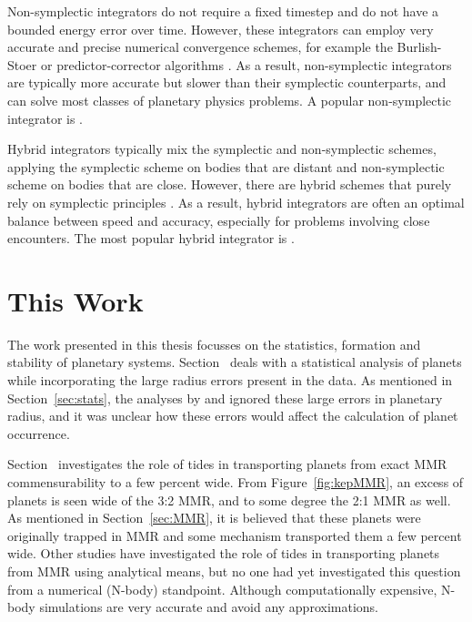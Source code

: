 Non-symplectic integrators do not require a fixed timestep and do not have a bounded energy error over time. 
However, these integrators can employ very accurate and precise numerical convergence schemes, for example the Burlish-Stoer or predictor-corrector algorithms \citep{Press2002}.
As a result, non-symplectic integrators are typically more accurate but slower than their symplectic counterparts, and can solve most classes of planetary physics problems. 
A popular non-symplectic integrator is \ias \citep{Rein2015}.

Hybrid integrators typically mix the symplectic and non-symplectic schemes, applying the symplectic scheme on bodies that are distant and non-symplectic scheme on bodies that are close. 
However, there are hybrid schemes that purely rely on symplectic principles \citep{Duncan1998}.
As a result, hybrid integrators are often an optimal balance between speed and accuracy, especially for problems involving close encounters. 
The most popular hybrid integrator is \mercury \citep{Chambers1999}.

\section{This Work}
The work presented in this thesis focusses on the statistics, formation and stability of planetary systems. 
Section~\label{Fill} deals with a statistical analysis of \kep planets while incorporating the large radius errors present in the \kep data. 
As mentioned in Section~\ref{sec:stats}, the analyses by \citet{Fressin2013} and \citet{Petigura2013} ignored these large errors in planetary radius, and it was unclear how these errors would affect the calculation of planet occurrence.

Section~\label{Fill} investigates the role of tides in transporting planets from exact MMR commensurability to a few percent wide. 
From Figure~\ref{fig:kepMMR}, an excess of planets is seen wide of the 3:2 MMR, and to some degree the 2:1 MMR as well. 
As mentioned in Section~\ref{sec:MMR}, it is believed that these planets were originally trapped in MMR and some mechanism transported them a few percent wide. 
Other studies have investigated the role of tides in transporting planets from MMR using analytical \citep{Lee2013, Delisle2014} means, but no one had yet investigated this question from a numerical (N-body) standpoint.
Although computationally expensive, N-body simulations are very accurate and avoid any approximations. 

